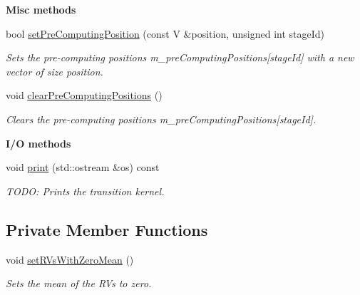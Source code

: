 \begin{Indent}{\bf Misc methods}\par
\begin{DoxyCompactItemize}
\item 
bool \hyperlink{class_q_u_e_s_o_1_1_scaled_cov_matrix_t_k_group_a4e6325c0cd92d555f32aef52ae4755e3}{set\-Pre\-Computing\-Position} (const V \&position, unsigned int stage\-Id)
\begin{DoxyCompactList}\small\item\em Sets the pre-\/computing positions {\ttfamily m\-\_\-pre\-Computing\-Positions}\mbox{[}stage\-Id\mbox{]} with a new vector of size {\ttfamily position}. \end{DoxyCompactList}\item 
void \hyperlink{class_q_u_e_s_o_1_1_scaled_cov_matrix_t_k_group_ae03597da61742f43997b8fffb7656b4d}{clear\-Pre\-Computing\-Positions} ()
\begin{DoxyCompactList}\small\item\em Clears the pre-\/computing positions {\ttfamily m\-\_\-pre\-Computing\-Positions}\mbox{[}stage\-Id\mbox{]}. \end{DoxyCompactList}\end{DoxyCompactItemize}
\end{Indent}
\begin{Indent}{\bf I/\-O methods}\par
\begin{DoxyCompactItemize}
\item 
void \hyperlink{class_q_u_e_s_o_1_1_scaled_cov_matrix_t_k_group_ac1116a3f10d1456c9b796d2756258e55}{print} (std\-::ostream \&os) const 
\begin{DoxyCompactList}\small\item\em T\-O\-D\-O\-: Prints the transition kernel. \end{DoxyCompactList}\end{DoxyCompactItemize}
\end{Indent}
\subsection*{Private Member Functions}
\begin{DoxyCompactItemize}
\item 
void \hyperlink{class_q_u_e_s_o_1_1_scaled_cov_matrix_t_k_group_ad61780456238817267b4f70cddffa24f}{set\-R\-Vs\-With\-Zero\-Mean} ()
\begin{DoxyCompactList}\small\item\em Sets the mean of the R\-Vs to zero. \end{DoxyCompactList}\end{DoxyCompactItemize}
